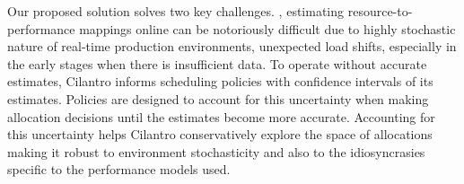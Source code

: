 


%

\insertFigCilantroOverview



Our proposed solution solves two key challenges.
, estimating resource-to-performance mappings online
can be notoriously difficult due to highly stochastic nature of real-time production environments,
unexpected load shifts,
especially  in the early stages when there is insufficient data.
To operate without accurate estimates, Cilantro
informs scheduling policies with confidence intervals of its estimates.
Policies are designed to account for this uncertainty when making allocation decisions
until the estimates become more accurate.
Accounting for this uncertainty helps Cilantro conservatively explore the space
of allocations making it robust to environment stochasticity
and also to the idiosyncrasies specific to the performance models used.
% 

